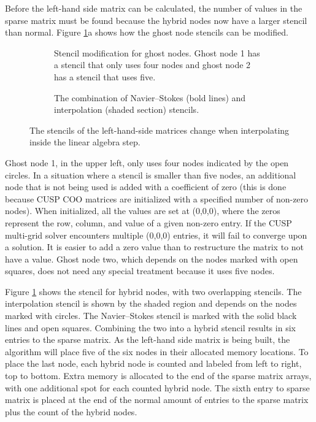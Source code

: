 \documentclass[preprint,12pt]{elsarticle}
\begin{document}
Before the left-hand side matrix can be calculated, the number of values in the sparse matrix must be found because the hybrid nodes now have a larger stencil than normal.
Figure \ref{fig:ID combined stencil}a shows how the ghost node stencils can be modified.
\begin{figure}[!htb]
	\centering
	\begin{subfigure}{0.5\textwidth}
		
		\caption{Stencil modification for ghost nodes. Ghost node 1 has a stencil that only uses four nodes and ghost node 2 has a stencil that uses five.}
	\end{subfigure}

	\begin{subfigure}{0.5\textwidth}
		
		\caption{The combination of Navier--Stokes (bold lines) and interpolation (shaded section) stencils.}
	\end{subfigure}
	\caption{The stencils of the left-hand-side matrices change when interpolating inside the linear algebra step.}
	\label{fig:ID combined stencil}
\end{figure}
Ghost node 1, in the upper left, only uses four nodes indicated by the open circles.
In a situation where a stencil is smaller than five nodes, an additional node that is not being used is added with a coefficient of zero (this is done because CUSP COO matrices are initialized with a specified number of non-zero nodes).
When initialized, all the values are set at (0,0,0), where the zeros represent the row, column, and value of a given non-zero entry.
If the CUSP multi-grid solver encounters multiple (0,0,0) entries, it will fail to converge upon a solution.
It is easier to add a zero value than to restructure the matrix to not have a value.
Ghost node two, which depends on the nodes marked with open squares, does not need any special treatment because it uses five nodes.

Figure \ref{fig:ID combined stencil} shows the stencil for hybrid nodes, with two overlapping stencils.
The interpolation stencil is shown by the shaded region and depends on the nodes marked with circles.
The Navier--Stokes stencil is marked with the solid black lines and open squares.
Combining the two into a hybrid stencil results in six entries to the sparse matrix.
As the left-hand side matrix is being built, the algorithm will place five of the six nodes in their allocated memory locations.
To place the last node, each hybrid node is counted and labeled from left to right, top to bottom.
Extra memory is allocated to the end of the sparse matrix arrays, with one additional spot for each counted hybrid node.
The sixth entry to sparse matrix is placed at the end of the normal amount of entries to the sparse matrix plus the count of the hybrid nodes.
\end{document}
